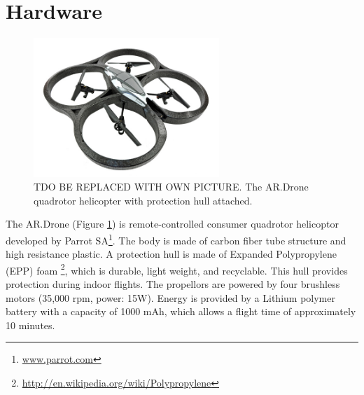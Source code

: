 \section{Hardware}
\begin{figure}[htb]
\centering
\includegraphics[width=7cm]{images/ardrone.jpg}
\caption{TDO BE REPLACED WITH OWN PICTURE. The AR.Drone quadrotor helicopter with protection hull attached.}
\label{fig:ardrone_hull}
\end{figure}
The AR.Drone (Figure \ref{fig:ardrone_hull}) is remote-controlled consumer quadrotor helicoptor developed by Parrot SA\footnote{\url{www.parrot.com}}.
The body is made of carbon fiber tube structure and high resistance 
plastic.
A protection hull is made of Expanded Polypropylene (EPP) foam \footnote{\url{http://en.wikipedia.org/wiki/Polypropylene}}, which is durable, light weight, and recyclable.
This hull provides protection during indoor flights.
The propellors are powered by four brushless motors (35,000 rpm, power: 15W).
Energy is provided by a Lithium polymer battery with a capacity of 1000 mAh, which allows a flight time of approximately 10 minutes.

